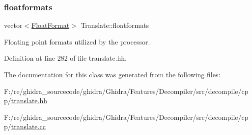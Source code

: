 \mbox{\label{class_translate_af609b454fe5a71cd72d9eaf525299fb5}} 
\subsubsection{\texorpdfstring{floatformats}{floatformats}}
{\footnotesize\ttfamily vector$<$\mbox{\hyperlink{class_float_format}{Float\+Format}}$>$ Translate\+::floatformats\hspace{0.3cm}{\ttfamily [protected]}}



Floating point formats utilized by the processor. 



Definition at line 282 of file translate.\+hh.



The documentation for this class was generated from the following files\+:\begin{DoxyCompactItemize}
\item 
F\+:/re/ghidra\+\_\+sourcecode/ghidra/\+Ghidra/\+Features/\+Decompiler/src/decompile/cpp/\mbox{\hyperlink{translate_8hh}{translate.\+hh}}\item 
F\+:/re/ghidra\+\_\+sourcecode/ghidra/\+Ghidra/\+Features/\+Decompiler/src/decompile/cpp/\mbox{\hyperlink{translate_8cc}{translate.\+cc}}\end{DoxyCompactItemize}
